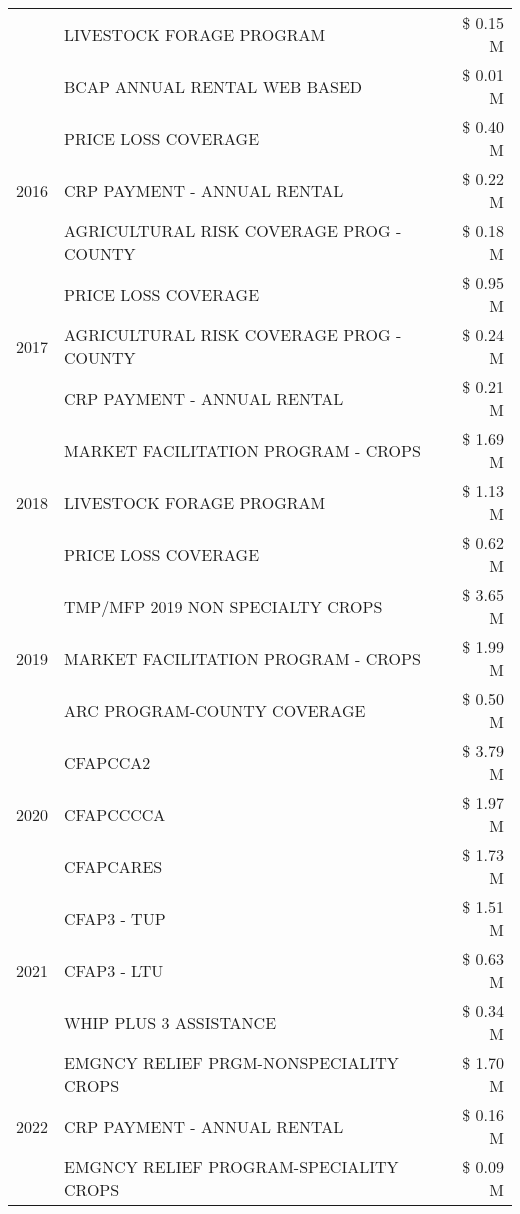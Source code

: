 \begin{tabular}{llr}
 & LIVESTOCK FORAGE PROGRAM & \$ 0.15 M \\
 & BCAP ANNUAL RENTAL WEB BASED & \$ 0.01 M \\
\cline{1-3}
\multirow[t]{3}{*}{2016} & PRICE LOSS COVERAGE & \$ 0.40 M \\
 & CRP PAYMENT - ANNUAL RENTAL & \$ 0.22 M \\
 & AGRICULTURAL RISK COVERAGE PROG - COUNTY & \$ 0.18 M \\
\cline{1-3}
\multirow[t]{3}{*}{2017} & PRICE LOSS COVERAGE & \$ 0.95 M \\
 & AGRICULTURAL RISK COVERAGE PROG - COUNTY & \$ 0.24 M \\
 & CRP PAYMENT - ANNUAL RENTAL & \$ 0.21 M \\
\cline{1-3}
\multirow[t]{3}{*}{2018} & MARKET FACILITATION PROGRAM - CROPS & \$ 1.69 M \\
 & LIVESTOCK FORAGE PROGRAM & \$ 1.13 M \\
 & PRICE LOSS COVERAGE & \$ 0.62 M \\
\cline{1-3}
\multirow[t]{3}{*}{2019} & TMP/MFP 2019 NON SPECIALTY CROPS & \$ 3.65 M \\
 & MARKET FACILITATION PROGRAM - CROPS & \$ 1.99 M \\
 & ARC PROGRAM-COUNTY COVERAGE & \$ 0.50 M \\
\cline{1-3}
\multirow[t]{3}{*}{2020} & CFAPCCA2 & \$ 3.79 M \\
 & CFAPCCCCA & \$ 1.97 M \\
 & CFAPCARES & \$ 1.73 M \\
\cline{1-3}
\multirow[t]{3}{*}{2021} & CFAP3 - TUP & \$ 1.51 M \\
 & CFAP3 - LTU & \$ 0.63 M \\
 & WHIP PLUS 3 ASSISTANCE & \$ 0.34 M \\
\cline{1-3}
\multirow[t]{3}{*}{2022} & EMGNCY RELIEF PRGM-NONSPECIALITY CROPS & \$ 1.70 M \\
 & CRP PAYMENT - ANNUAL RENTAL & \$ 0.16 M \\
 & EMGNCY RELIEF PROGRAM-SPECIALITY CROPS & \$ 0.09 M \\
\cline{1-3}
\bottomrule
\end{tabular}
